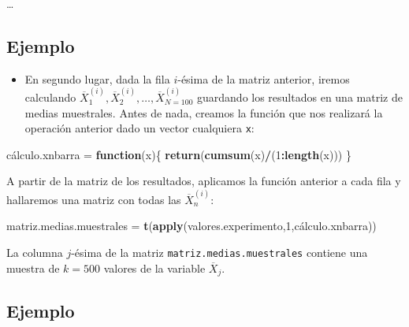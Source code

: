 \documentclass[]{book}
\newenvironment{Shaded}{\begin{snugshade}}{\end{snugshade}}
\newcommand{\ControlFlowTok}[1]{\textcolor[rgb]{0.13,0.29,0.53}{\textbf{#1}}}
\newcommand{\DecValTok}[1]{\textcolor[rgb]{0.00,0.00,0.81}{#1}}
\newcommand{\KeywordTok}[1]{\textcolor[rgb]{0.13,0.29,0.53}{\textbf{#1}}}
\newcommand{\NormalTok}[1]{#1}
\newcommand{\OperatorTok}[1]{\textcolor[rgb]{0.81,0.36,0.00}{\textbf{#1}}}
\newcommand{\StringTok}[1]{\textcolor[rgb]{0.31,0.60,0.02}{#1}}
\providecommand{\tightlist}{%
  \setlength{\itemsep}{0pt}\setlength{\parskip}{0pt}}
\begin{document}
\ldots{}

\hypertarget{ejemplo-145}{%
\subsection{Ejemplo}\label{ejemplo-145}}

\begin{itemize}
\tightlist
\item
  En segundo lugar, dada la fila \(i\)-ésima de la matriz anterior, iremos calculando \(\overline{X}_1^{(i)},\overline{X}_2^{(i)},\ldots,\overline{X}_{N=100}^{(i)}\) guardando los resultados en una matriz de medias muestrales.
  Antes de nada, creamos la función que nos realizará la operación anterior dado un vector cualquiera \texttt{x}:
\end{itemize}

\begin{Shaded}
\begin{Highlighting}[]
\NormalTok{cálculo.xnbarra =}\StringTok{ }\ControlFlowTok{function}\NormalTok{(x)\{}
  \KeywordTok{return}\NormalTok{(}\KeywordTok{cumsum}\NormalTok{(x)}\OperatorTok{/}\NormalTok{(}\DecValTok{1}\OperatorTok{:}\KeywordTok{length}\NormalTok{(x)))}
\NormalTok{\}}
\end{Highlighting}
\end{Shaded}

A partir de la matriz de los resultados, aplicamos la función anterior a cada fila y hallaremos una matriz con todas las \(\overline{X}_n^{(i)}\):

\begin{Shaded}
\begin{Highlighting}[]
\NormalTok{matriz.medias.muestrales =}\StringTok{ }\KeywordTok{t}\NormalTok{(}\KeywordTok{apply}\NormalTok{(valores.experimento,}\DecValTok{1}\NormalTok{,cálculo.xnbarra))}
\end{Highlighting}
\end{Shaded}

La columna \(j\)-ésima de la matriz \texttt{matriz.medias.muestrales} contiene una muestra de \(k=500\) valores de la variable \(\overline{X}_j\).

\hypertarget{ejemplo-146}{%
\subsection{Ejemplo}\label{ejemplo-146}}
\end{document}
